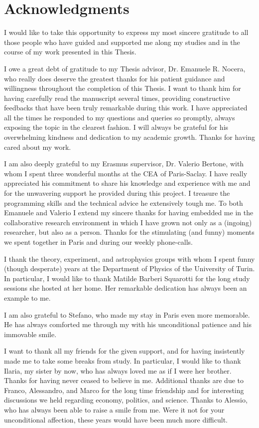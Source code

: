 \chapter*{Acknowledgments}
%
I would like to take this opportunity to express my most sincere gratitude to all those people who have guided and supported me along my studies and in the course of my work presented in this Thesis.\medbreak

\noindent I owe a great debt of gratitude to my Thesis advisor, Dr. Emanuele R. Nocera, who really does deserve the greatest thanks for his patient guidance and willingness throughout the completion of this Thesis. I want to thank him for having carefully read the manuscript several times, providing constructive feedbacks that have been truly remarkable during this work. I have appreciated all the times he responded to my questions and queries so promptly, always exposing the topic in the clearest fashion. I will always be grateful for his overwhelming kindness and dedication to my academic growth. Thanks for having cared about my work.  
\medbreak

\noindent I am also deeply grateful to my Erasmus supervisor, Dr. Valerio Bertone, with whom I spent three wonderful months at the CEA of Paris-Saclay. I have really appreciated his commitment to share his knowledge and experience with me and for the unwavering support he provided during this project. I treasure the programming skills and the technical advice he extensively tough me. To both Emanuele and Valerio I extend my sincere thanks for having embedded me in the collaborative research environment in which I have grown not only as a (ingoing) researcher, but also as a person. Thanks for the stimulating (and funny) moments we spent together in Paris and during our weekly phone-calls.\medbreak

\noindent I thank the theory, experiment, and astrophysics groups with whom I spent funny (though desperate) years at the Department of Physics of the University of Turin. In particular, I would like to thank Matilde Barberi Squarotti for the long study sessions she hosted at her home. Her remarkable dedication has always been an example to me.\medbreak

\noindent I am also grateful to Stefano, who made my stay in Paris even more memorable. He has always comforted me through my  with his unconditional patience and his immovable smile.\medbreak

\noindent I want to thank all my friends for the given support, and for having insistently made me to take some breaks from study. In particular, I would like to thank Ilaria, my sister by now, who has always loved me as if I were her brother. Thanks for having never ceased to believe in me. Additional thanks are due to Franco, Alessandro, and Marco for the long time friendship and for interesting discussions we held regarding economy, politics, and science. Thanks to Alessio, who has always been able to raise a smile from me. Were it not for your unconditional affection, these years would have been much more difficult.\medbreak

